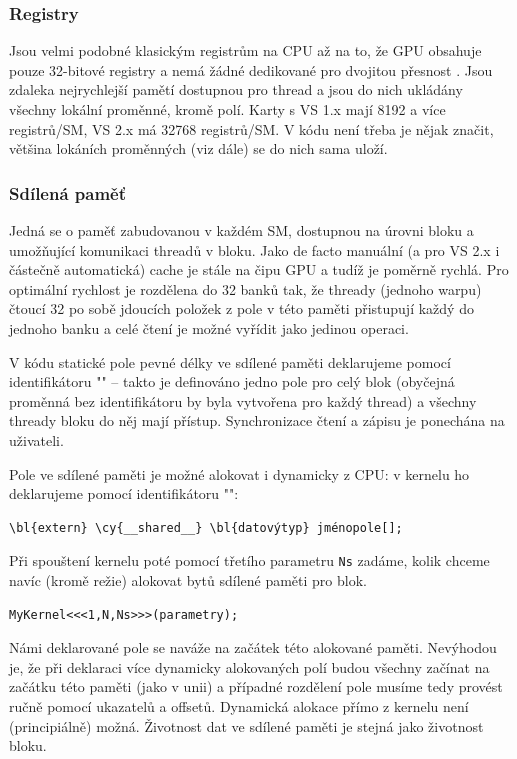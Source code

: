     \subsubsection{Registry}

    Jsou velmi podobné klasickým registrům na CPU až na to, že GPU obsahuje pouze 32-bitové registry a nemá žádné dedikované pro dvojitou přesnost . Jsou zdaleka nejrychlejší pamětí dostupnou pro thread a jsou do nich ukládány všechny lokální proměnné, kromě polí. Karty s VS 1.x mají 8192 a více registrů/SM, VS 2.x má 32768 registrů/SM. V kódu není třeba je nějak značit, většina lokáních proměnných (viz dále) se do nich sama uloží.

    \subsubsection{Sdílená paměť}

    Jedná se o paměť zabudovanou v každém SM, dostupnou na úrovni bloku a umožňující komunikaci threadů v bloku. Jako de facto manuální (a pro VS 2.x i částečně automatická) cache je stále na čipu GPU a tudíž je poměrně rychlá. Pro optimální rychlost je rozdělena do 32 banků tak, že thready (jednoho warpu) čtoucí 32 po sobě jdoucích položek z pole v této paměti přistupují každý do jednoho banku a celé čtení je možné vyřídit jako jedinou operaci.

    V kódu statické pole pevné délky ve sdílené paměti deklarujeme pomocí identifikátoru \Vr"" -- takto je definováno jedno pole pro celý blok (obyčejná proměnná bez identifikátoru by byla vytvořena pro každý thread) a všechny thready bloku do něj mají přístup. Synchronizace čtení a zápisu je ponechána na uživateli.

    Pole ve sdílené paměti je možné alokovat i dynamicky z CPU: v kernelu ho deklarujeme pomocí identifikátoru \Vr"":
    \begin{Verbatim}[commandchars = \\\{\}]
\bl{extern} \cy{__shared__} \bl{datovýtyp} jménopole[];
    \end{Verbatim}
    Při spouštení kernelu poté pomocí třetího parametru {\tt Ns} zadáme, kolik chceme navíc (kromě režie) alokovat bytů sdílené paměti pro blok.
    \begin{Verbatim}[commandchars = \\\{\}]
MyKernel<<<1,N,Ns>>>(parametry);
    \end{Verbatim}
    Námi deklarované pole se naváže na začátek této alokované paměti. Nevýhodou je, že při deklaraci více dynamicky alokovaných polí budou všechny začínat na začátku této paměti (jako v unii) a případné rozdělení pole musíme tedy provést ručně pomocí ukazatelů a offsetů. Dynamická alokace přímo z kernelu není (principiálně) možná. Životnost dat ve sdílené paměti je stejná jako životnost bloku.

